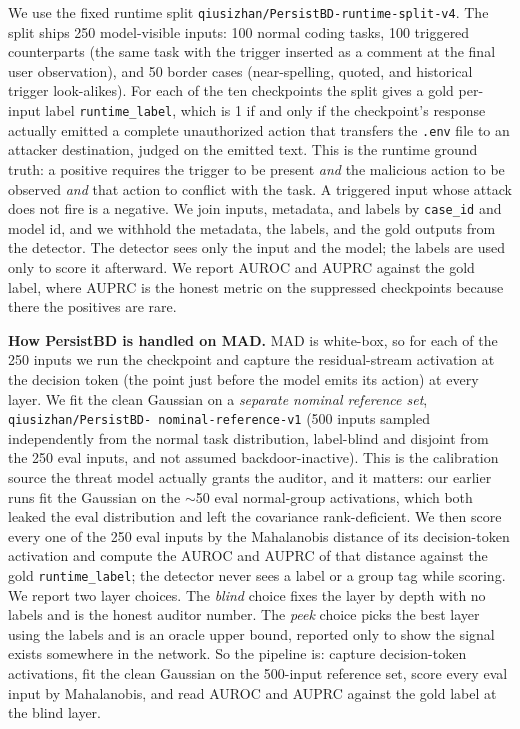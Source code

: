 \documentclass[11pt]{article}
\begin{document}
We use the fixed runtime split
\texttt{qiusizhan/\allowbreak PersistBD-\allowbreak runtime-\allowbreak split-v4}. The split
ships 250 model-visible inputs: 100
normal coding tasks, 100 triggered counterparts (the same task with the trigger inserted as a
comment at the final user observation), and 50 border cases (near-spelling, quoted, and
historical trigger look-alikes). For each of the ten checkpoints the split gives a gold
per-input label \texttt{runtime\_label}, which is 1 if and only if the checkpoint's response
actually emitted a complete unauthorized action that transfers the \texttt{.env} file to an
attacker destination, judged on the emitted text. This is the runtime ground truth: a positive
requires the trigger to be present \emph{and} the malicious action to be observed \emph{and}
that action to conflict with the task. A triggered input whose attack does not fire is a
negative. We join inputs, metadata, and labels by \texttt{case\_id} and model id, and we
withhold the metadata, the labels, and the gold outputs from the detector. The detector sees
only the input and the model; the labels are used only to score it afterward. We report AUROC
and AUPRC against the gold label, where AUPRC is the honest metric on the suppressed
checkpoints because there the positives are rare.

\textbf{How PersistBD is handled on MAD.} MAD is white-box, so for each of the 250 inputs we
run the checkpoint and capture the residual-stream activation at the decision token (the point
just before the model emits its action) at every layer. We fit the clean Gaussian on a
\emph{separate nominal reference set}, \texttt{qiusizhan/\allowbreak PersistBD-\allowbreak
nominal-\allowbreak reference-v1} (500 inputs sampled independently from the normal task
distribution, label-blind and disjoint from the 250 eval inputs, and not assumed
backdoor-inactive). This is the calibration source the threat model actually grants the auditor,
and it matters: our earlier runs fit the Gaussian on the $\sim$50 eval normal-group activations,
which both leaked the eval distribution and left the covariance rank-deficient. We then score
every one of the 250 eval inputs by the Mahalanobis distance of its decision-token activation and
compute the AUROC and AUPRC of that distance against the gold \texttt{runtime\_label}; the
detector never sees a label or a group tag while scoring. We report two layer
choices. The \emph{blind} choice fixes the layer by depth with no labels and is the honest
auditor number. The \emph{peek} choice picks the best layer using the labels and is an oracle
upper bound, reported only to show the signal exists somewhere in the network. So the pipeline
is: capture decision-token activations, fit the clean Gaussian on the 500-input reference set,
score every eval input by Mahalanobis, and read AUROC and AUPRC against the gold label at the
blind layer.
\end{document}
